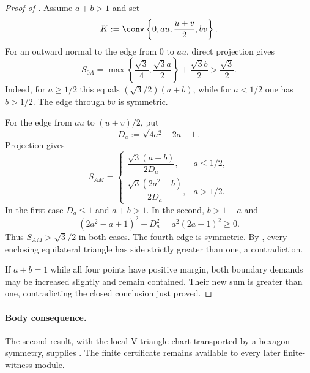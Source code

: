 \begin{proof}[Proof of ]
Assume $a+b>1$ and set
\[
 K:=\conv\left\{0,au,\frac{u+v}{2},bv\right\}.
\]
For an outward normal to the edge from $0$ to $au$, direct projection gives
\[
 S_{0A}=
 \max\left\{\frac{\sqrt3}{4},\frac{\sqrt3a}{2}\right\}
 +\frac{\sqrt3b}{2}>\frac{\sqrt3}{2}.
\]
Indeed, for $a\ge1/2$ this equals
$(\sqrt3/2)(a+b)$, while for $a<1/2$ one has $b>1/2$.  The edge through
$bv$ is symmetric.

For the edge from $au$ to $(u+v)/2$, put
\[
 D_a:=\sqrt{4a^2-2a+1}.
\]
Projection gives
\[
 S_{AM}=
 \begin{cases}
 \dfrac{\sqrt3(a+b)}{2D_a},&a\le1/2,\\[4pt]
 \dfrac{\sqrt3(2a^2+b)}{2D_a},&a>1/2.
 \end{cases}
\]
In the first case $D_a\le1$ and $a+b>1$.  In the second, $b>1-a$ and
\[
 (2a^2-a+1)^2-D_a^2=a^2(2a-1)^2\ge0.
\]
Thus $S_{AM}>\sqrt3/2$ in both cases.  The fourth edge is symmetric.  By
, every enclosing equilateral triangle has side
strictly greater than one, a contradiction.

If $a+b=1$ while all four points have positive margin, both boundary demands
may be increased slightly and remain contained.  Their new sum is greater
than one, contradicting the closed conclusion just proved.
\end{proof}

\paragraph{Body consequence.}
The second result, with the local V-triangle chart transported by a hexagon
symmetry, supplies .  The finite certificate remains
available to every later finite-witness module.
